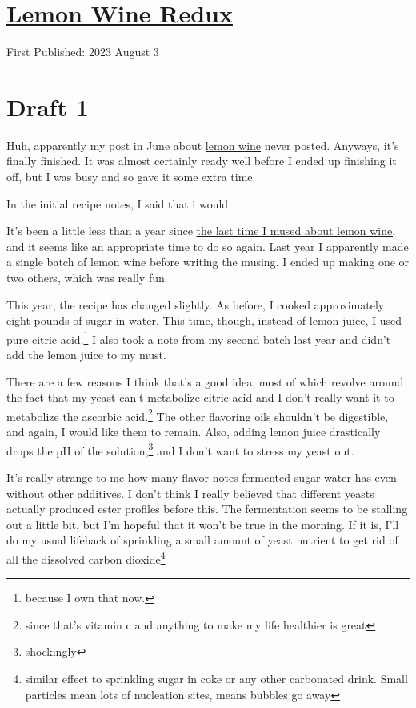 \documentclass[12pt]{article}[titlepage]
\newcommand{\1}{\={a}}
\newcommand{\2}{\={e}}
\newcommand{\3}{\={\i}}
\newcommand{\4}{\=o}
\newcommand{\5}{\=u}
\newcommand{\6}{\={A}}
\renewcommand{\,}{\textsuperscript{,}}
\begin{document}
\doublespacing
\section{\href{lemon-wine-2.html}{Lemon Wine Redux}}
First Published: 2023 August 3


\section{Draft 1}
Huh, apparently my post in June about \href{lemon-wine-2.hmtl}{lemon wine} never posted.
Anyways, it's finally finished.
It was almost certainly ready well before I ended up finishing it off, but I was busy and so gave it some extra time.

In the initial recipe notes, I said that i would


It's been a little less than a year since \href{lemon-wine.html}{the last time I mused about lemon wine,} and it seems like an appropriate time to do so again.
Last year I apparently made a single batch of lemon wine before writing the musing.
I ended up making one or two others, which was really fun.

This year, the recipe has changed slightly.
As before, I cooked approximately eight pounds of sugar in water.
This time, though, instead of lemon juice, I used pure citric acid.\footnote{because I own that now.}
I also took a note from my second batch last year and didn't add the lemon juice to my must.

There are a few reasons I think that's a good idea, most of which revolve around the fact that my yeast can't metabolize citric acid and I don't really want it to metabolize the ascorbic acid.\footnote{since that's vitamin c and anything to make my life healthier is great}
The other flavoring oils shouldn't be digestible, and again, I would like them to remain.
Also, adding lemon juice drastically drops the pH of the solution,\footnote{shockingly} and I don't want to stress my yeast out.

It's really strange to me how many flavor notes fermented sugar water has even without other additives.
I don't think I really believed that different yeasts actually produced ester profiles before this.
The fermentation seems to be stalling out a little bit, but I'm hopeful that it won't be true in the morning.
If it is, I'll do my usual lifehack of sprinkling a small amount of yeast nutrient to get rid of all the dissolved carbon dioxide\footnote{similar effect to sprinkling sugar in coke or any other carbonated drink. Small particles mean lots of nucleation sites, means bubbles go away}
\end{document}
